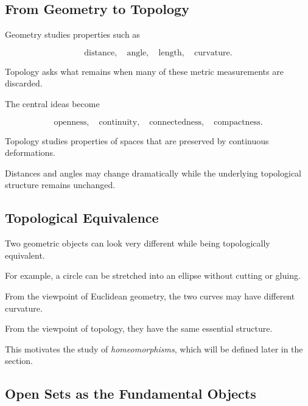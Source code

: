 \subsection{From Geometry to Topology}
\label{subsec:from-geometry-to-topology}

Geometry studies properties such as

\[
\boxed{
\text{distance},
\quad
\text{angle},
\quad
\text{length},
\quad
\text{curvature}.
}
\]

Topology asks what remains when many of these metric measurements are
discarded.

The central ideas become

\[
\boxed{
\text{openness},
\quad
\text{continuity},
\quad
\text{connectedness},
\quad
\text{compactness}.
}
\]

\begin{conceptbox}
Topology studies properties of spaces that are preserved by continuous
deformations.

Distances and angles may change dramatically while the underlying
topological structure remains unchanged.
\end{conceptbox}

\subsection{Topological Equivalence}
\label{subsec:topological-equivalence-intro}

Two geometric objects can look very different while being topologically
equivalent.

For example, a circle can be stretched into an ellipse without cutting or
gluing.

From the viewpoint of Euclidean geometry, the two curves may have different
curvature.

From the viewpoint of topology, they have the same essential structure.

This motivates the study of \emph{homeomorphisms}, which will be defined
later in the section.

\subsection{Open Sets as the Fundamental Objects}
\label{subsec:open-sets-fundamental}

